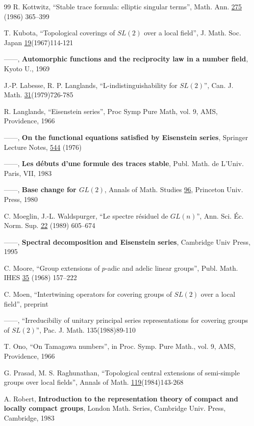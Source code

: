 \begin{thebibliography}{99}
 R. Kottwitz, ``Stable trace formula: elliptic singular
terms'', Math. Ann. \underline{275} (1986) 365--399

T. Kubota, ``Topological coverings of $SL(2)$ over a local field'', J.
Math. Soc. Japan \underline{19}(1967)114-121

 ------, {\bf Automorphic functions and the reciprocity
law in a number field}, Kyoto U., 1969

J.-P. Labesse, R. P. Langlands, ``L-indistinguishability for $SL(2)$'',
Can. J. Math. \underline{31}(1979)726-785

 R. Langlands, ``Eisenstein series'', Proc Symp Pure Math,
vol. 9, AMS,
Providence, 1966

 ------, {\bf On the functional equations satisfied
by Eisenstein series}, Springer Lecture Notes, \underline{544} (1976)

 ------, {\bf Les d\'ebuts d'une formule des traces 
stable}, Publ. Math. de L'Univ. Paris, VII, 1983

 ------, {\bf Base change for $GL(2)$},
Annals of Math. Studies \underline{96}, Princeton Univ. Press, 1980

 C. Moeglin, J.-L. Waldspurger,
``Le spectre r\'esiduel de $GL(n)$'', Ann. Sci. \'Ec. Norm. Sup.
\underline{22} (1989) 605--674

 ------,
{\bf Spectral decomposition and Eisenstein series},
Cambridge Univ Press, 1995

 C. Moore, ``Group extensions of $p$-adic and adelic linear
groups'', Publ. Math. IHES \underline{35} (1968) 157--222

 C. Moen, ``Intertwining operators for covering groups
of $SL(2)$ over
a local field'', preprint

 ------, ``Irreducibiliy of unitary principal series
representations
for covering groups of $SL(2)$'', Pac. J. Math. 135(1988)89-110

 T. Ono, ``On Tamagawa numbers'', in Proc. Symp. Pure Math.,
vol. 9, AMS,
Providence, 1966

 G. Prasad, M. S. Raghunathan,
``Topological central extensions of
semi-simple groups over local fields'', Annals of Math.
\underline{119}(1984)143-268

 A. Robert, {\bf Introduction to the
representation theory of compact and locally compact groups},
London Math. Series, Cambridge Univ. Press, Cambridge, 1983


\end{thebibliography}
